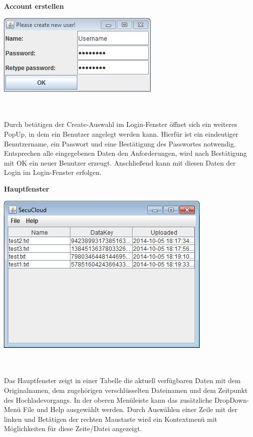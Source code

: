 \documentclass[12pt,a4paper,bibliography=totocnumbered,listof=totocnumbered]{scrartcl}
\begin{document}
\textbf{Account erstellen}
\vspace{1em}
$\;$\\
\begin{minipage}{\linewidth}
	\centering
	\includegraphics[width=0.4\linewidth]{Create.jpg}
	\label{Create}
\end{minipage}
\\\\Durch betätigen der Create-Auswahl im Login-Fenster öffnet sich ein weiteres PopUp, in dem ein Benutzer angelegt werden kann. Hierfür ist ein eindeutiger Benutzername, ein Passwort und eine Bestätigung des Passwortes notwendig. Entsprechen alle eingegebenen Daten den Anforderungen, wird nach Bestätigung mit OK ein neuer Benutzer erzeugt. Anschließend kann mit diesen Daten der Login im Login-Fenster erfolgen.

\textbf{Hauptfenster}
\vspace{1em}
$\;$\\
\begin{minipage}{\linewidth}
	\centering
	\includegraphics[width=0.4\linewidth]{Main.jpg}
	\label{Main}
\end{minipage}
\\\\Das Hauptfenster zeigt in einer Tabelle die aktuell verfügbaren Daten mit dem Originalnamen, dem zugehörigen verschlüsselten Dateinamen und dem Zeitpunkt des Hochladevorgangs. In der oberen Menüleiste kann das zusätzliche DropDown-Menü File und Help ausgewählt werden. Durch Auswählen einer Zeile mit der linken und Betätigen der rechten Maustaste wird ein Kontextmenü mit Möglichkeiten für diese Zeite/Datei angezeigt.
\end{document}

